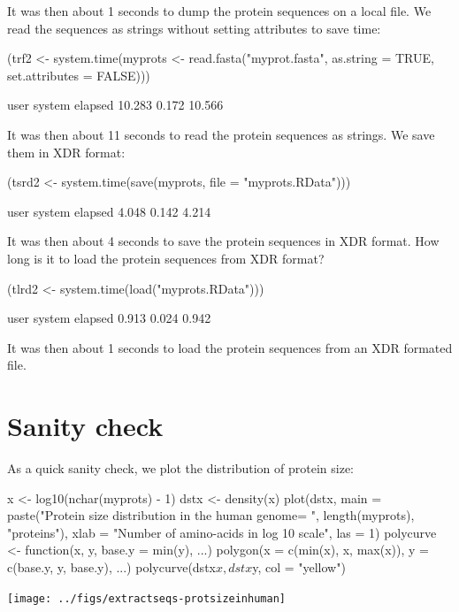\documentclass{article}
\begin{document}
It was then about 1 seconds
to dump the protein sequences on a local file. We read the sequences as strings
without setting attributes to save time:

\begin{Schunk}
\begin{Sinput}
 (trf2 <- system.time(myprots <- read.fasta("myprot.fasta", 
     as.string = TRUE, set.attributes = FALSE)))
\end{Sinput}
\begin{Soutput}
   user  system elapsed 
 10.283   0.172  10.566 
\end{Soutput}
\end{Schunk}

It was then about 11 seconds
to read the protein sequences as strings. We save them in XDR format:

\begin{Schunk}
\begin{Sinput}
 (tsrd2 <- system.time(save(myprots, file = "myprots.RData")))
\end{Sinput}
\begin{Soutput}
   user  system elapsed 
  4.048   0.142   4.214 
\end{Soutput}
\end{Schunk}

It was then about 4 seconds
to save the protein sequences in XDR format. How long is it to load the 
protein sequences from XDR format?

\begin{Schunk}
\begin{Sinput}
 (tlrd2 <- system.time(load("myprots.RData")))
\end{Sinput}
\begin{Soutput}
   user  system elapsed 
  0.913   0.024   0.942 
\end{Soutput}
\end{Schunk}

It was then about 1 seconds
to load the protein sequences from an XDR formated file.

\section{Sanity check}

As a quick sanity check, we plot the distribution of protein size:


\begin{Schunk}
\begin{Sinput}
 x <- log10(nchar(myprots) - 1)
 dstx <- density(x)
 plot(dstx, main = paste("Protein size distribution in the human genome\nn = ", 
     length(myprots), "proteins"), xlab = "Number of amino-acids in log 10 scale", 
     las = 1)
 polycurve <- function(x, y, base.y = min(y), ...) polygon(x = c(min(x), 
     x, max(x)), y = c(base.y, y, base.y), ...)
 polycurve(dstx$x, dstx$y, col = "yellow")
\end{Sinput}
\end{Schunk}
\texttt{[image: ../figs/extractseqs-protsizeinhuman]}
\end{document}
